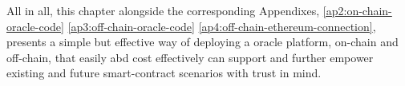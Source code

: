 All in all, this chapter alongside the corresponding Appendixes, \ref{ap2:on-chain-oracle-code} \ref{ap3:off-chain-oracle-code} \ref{ap4:off-chain-ethereum-connection}, presents a simple but effective way of deploying a oracle platform, on-chain and off-chain, that easily abd cost effectively can support and further empower existing and future smart-contract scenarios with trust in mind.